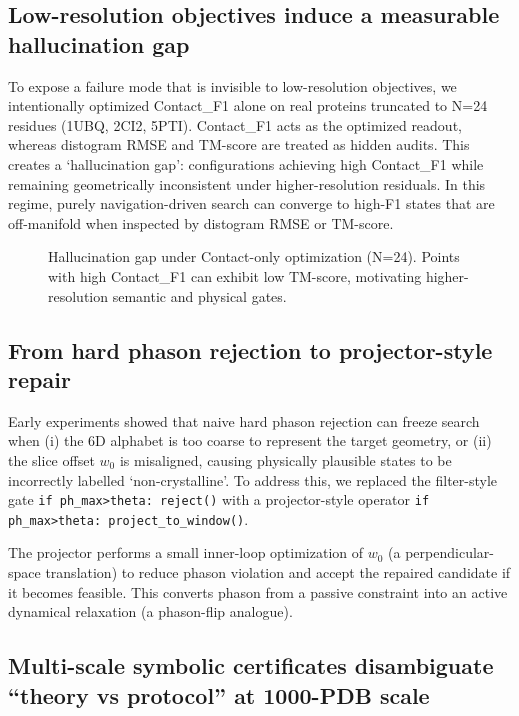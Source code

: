 \subsection{Low-resolution objectives induce a measurable hallucination gap}

To expose a failure mode that is invisible to low-resolution objectives, we intentionally optimized Contact\_F1 alone on real proteins truncated to N=24 residues (1UBQ, 2CI2, 5PTI). Contact\_F1 acts as the optimized readout, whereas distogram RMSE and TM-score are treated as hidden audits. This creates a ‘hallucination gap’: configurations achieving high Contact\_F1 while remaining geometrically inconsistent under higher-resolution residuals. In this regime, purely navigation-driven search can converge to high-F1 states that are off-manifold when inspected by distogram RMSE or TM-score.

\begin{figure}[t]
  \centering
  \caption{Hallucination gap under Contact-only optimization (N=24). Points with high Contact\_F1 can exhibit low TM-score, motivating higher-resolution semantic and physical gates.}
  \label{fig:3}
\end{figure}

\subsection{From hard phason rejection to projector-style repair}

Early experiments showed that naive hard phason rejection can freeze search when (i) the 6D alphabet is too coarse to represent the target geometry, or (ii) the slice offset $w_0$ is misaligned, causing physically plausible states to be incorrectly labelled ‘non-crystalline’. To address this, we replaced the filter-style gate \texttt{if ph\_max>theta: reject()} with a projector-style operator \texttt{if ph\_max>theta: project\_to\_window()}.

The projector performs a small inner-loop optimization of $w_0$ (a perpendicular-space translation) to reduce phason violation and accept the repaired candidate if it becomes feasible. This converts phason from a passive constraint into an active dynamical relaxation (a phason-flip analogue).

\subsection{Multi-scale symbolic certificates disambiguate ``theory vs protocol'' at 1000-PDB scale}

